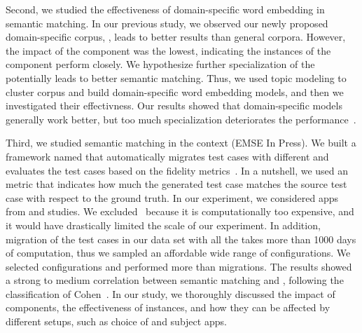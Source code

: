 \smallskip 
Second, we studied the effectiveness of domain-specific word embedding in semantic matching. In our previous study, we observed our newly proposed domain-specific corpus, \gp, leads to better results than general corpora.  
However, the impact of the \corpus component was the lowest, indicating the instances of the component perform closely. 
We hypothesize further specialization of the \corpus  potentially leads to better semantic matching.  
Thus, we used topic modeling to cluster \gp corpus and build domain-specific word embedding models, and then we investigated  their effectivness.
Our results showed that domain-specific models generally work better, but too much specialization deteriorates the performance~\cite{khalili:DomainEmbedding:ICPC:2022}.



\smallskip 
Third, we studied semantic matching in the \testreuse context (EMSE In Press).
We built a framework named \tme that automatically migrates test cases with different \smconfigs and evaluates the test cases based on the fidelity metrics~\cite{zhao:fruiter:fse:2020}.
In a nutshell, we used an \fscore metric that indicates how much the generated test case matches the source test case with respect to the ground truth.
In our experiment, we considered  \nexecapps apps from \atm and \craftdroid studies.
We excluded \adaptdroid~\selector because it is computationally too expensive, and it would have drastically limited the scale of our experiment.
In addition, migration of the test cases in our data set with all the \smconfigs takes more than 1000 days of computation, thus we sampled an affordable wide range of configurations.  
We selected \nsampledcomb configurations and performed more than \nmigrations migrations.
The results showed a strong to medium correlation between semantic matching and \testreuse, following the classification of Cohen~\cite{cohen:statisticalpower:Routledge:2013}.
In our study, we  thoroughly discussed the impact of components, the effectiveness of instances, and how they can be affected by different setups, such as choice of \selector and subject apps.

